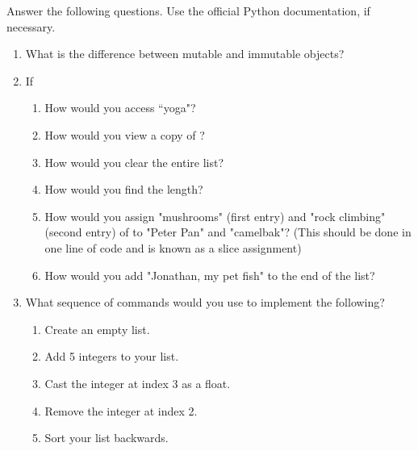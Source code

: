 \begin{problem}
Answer the following questions. Use the official Python documentation, if necessary.

\begin{enumerate}
\item What is the difference between mutable and immutable objects?
\item If 
\begin{enumerate}
\item How would you access ``yoga"? 
\item How would you view a copy of ?
\item How would you clear the entire list? 
\item How would you find the length? 
\item How would you assign "mushrooms" (first entry) and "rock climbing" (second entry) 
of  to "Peter Pan" and "camelbak"? 
(This should be done in one line of code and is known as a slice assignment)
\item How would you add "Jonathan, my pet fish" to the end of the list?
\end{enumerate}
\item What sequence of commands would you use to implement the following?

\begin{enumerate}
\item Create an empty list. 
\item Add 5 integers to your list. 
\item Cast the integer at index 3 as a float.
\item Remove the integer at index 2. 
\item Sort your list backwards.

\end{enumerate}
\end{enumerate}
\end{problem}



